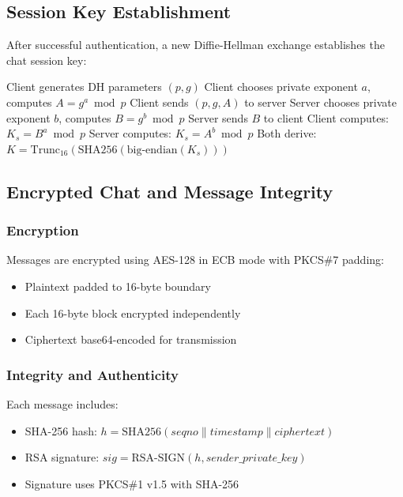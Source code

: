 \documentclass[runningheads]{llncs}
\begin{document}
\subsection{Session Key Establishment}

After successful authentication, a new Diffie-Hellman exchange establishes the chat session key:

\begin{algorithm}
\caption{Session Key Establishment}
\begin{algorithmic}[1]
\State Client generates DH parameters $(p, g)$
\State Client chooses private exponent $a$, computes $A = g^a \bmod p$
\State Client sends $(p, g, A)$ to server
\State Server chooses private exponent $b$, computes $B = g^b \bmod p$
\State Server sends $B$ to client
\State Client computes: $K_s = B^a \bmod p$
\State Server computes: $K_s = A^b \bmod p$
\State Both derive: $K = \text{Trunc}_{16}(\text{SHA256}(\text{big-endian}(K_s)))$
\end{algorithmic}
\end{algorithm}

\subsection{Encrypted Chat and Message Integrity}

\subsubsection{Encryption}

Messages are encrypted using AES-128 in ECB mode with PKCS\#7 padding:
\begin{itemize}
    \item Plaintext padded to 16-byte boundary
    \item Each 16-byte block encrypted independently
    \item Ciphertext base64-encoded for transmission
\end{itemize}

\subsubsection{Integrity and Authenticity}

Each message includes:
\begin{itemize}
    \item SHA-256 hash: $h = \text{SHA256}(seqno \| timestamp \| ciphertext)$
    \item RSA signature: $sig = \text{RSA-SIGN}(h, sender\_private\_key)$
    \item Signature uses PKCS\#1 v1.5 with SHA-256
\end{itemize}
\end{document}
